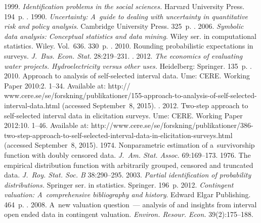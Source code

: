 \begin{multicols}{2}
{{\begin{thebibliography}{99}
 1999.
\textit{Identification problems in the social sciences.} Harvard University
Press. 194~p.
. 1990. 
\textit{Uncertainty: A~guide to dealing with uncertainty in
quantitative risk and policy analysis}. Cambridge University Press. 
 325~p.
. 2006. 
\textit{Symbolic data analysis: Conceptual statistics
and data mining}. Wiley ser. in computational statistics. Wiley. Vol.~636.
330~p.
.  2010.
Rounding probabilistic expectations in surveys. 
\textit{J.~Bus. Econ. Stat.} 28:219--231.
. 2012. 
\textit{The economics of evaluating water projects.
Hydroelectricity versus other uses.} Heidelberg: Springer. 135~p.
. 2010. 
Approach to analysis of self-selected interval data.
\mbox{Ume}: CERE.
Working Paper 2010:2. 1--34. 
Available at: {\sf  http:// www.cere.se/se/forskning/publikationer/155-approach-to-analysis-of-self-selected-interval-data.html}
(accessed September~8, 2015).
. 2012. 
Two-step approach to self-selected interval
data in elicitation surveys. 
\mbox{Ume}:
CERE. Working Paper 2012:10. 1--46.
Available at: {\sf  http://www.cere.se/se/forskning/publikationer/386-two-step-approach-to-self-selected-interval-data-in-elicitation-surveys.html}
(accessed September~8, 2015).
  1974. 
Nonparametric estimation of a~survivorship function with doubly censored data.
\textit{J.~Am. Stat. Assoc.} 69:169--173.
 1976. 
The empirical distribution function with arbitrarily grouped,
censored and truncated data. \textit{J.~Roy. Stat. Soc. B} 38:290--295.
 2003.
\textit{Partial identification of probability distributions.} Springer ser.
in statistics. Springer. 196~p.
 2012. \textit{Contingent valuation: A~comprehensive bibliography and history}.
Edward Elgar Publishing. 464~p.
. 2008. 
A~new valuation question~--- analysis of and insights from interval
 open ended data in contingent valuation. 
 \textit{Environ. Resour. Econ.} 39(2):175--188.

\end{thebibliography}}}
\end{multicols}
